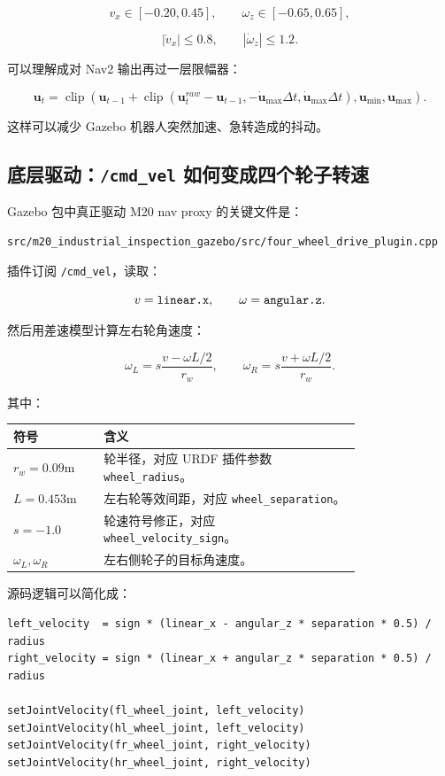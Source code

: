\documentclass[UTF8,11pt,a4paper]{ctexart}
\newcommand{\bs}[1]{\bm{#1}}
\begin{document}
\[
v_x\in[-0.20,0.45],\qquad
\omega_z\in[-0.65,0.65],
\]

\[
|\dot v_x|\le 0.8,\qquad
|\dot\omega_z|\le 1.2.
\]

可以理解成对 Nav2 输出再过一层限幅器：

\[
\boxed{
\bs u_t
=
\operatorname{clip}
\left(
\bs u_{t-1}
+
\operatorname{clip}(\bs u_t^{raw}-\bs u_{t-1},-\dot{\bs u}_{\max}\Delta t,\dot{\bs u}_{\max}\Delta t),
\bs u_{\min},\bs u_{\max}
\right).
}
\]

这样可以减少 Gazebo 机器人突然加速、急转造成的抖动。

\subsection{底层驱动：\texttt{/cmd\_vel} 如何变成四个轮子转速}

Gazebo 包中真正驱动 M20 nav proxy 的关键文件是：

\begin{verbatim}
src/m20_industrial_inspection_gazebo/src/four_wheel_drive_plugin.cpp
\end{verbatim}

插件订阅 \texttt{/cmd\_vel}，读取：

\[
v = \text{\texttt{linear.x}},\qquad
\omega = \text{\texttt{angular.z}}.
\]

然后用差速模型计算左右轮角速度：

\[
\boxed{
\omega_L
=
s\frac{v-\omega L/2}{r_w},
\qquad
\omega_R
=
s\frac{v+\omega L/2}{r_w}.
}
\]

其中：

\begin{center}
\renewcommand{\arraystretch}{1.25}
\begin{tabular}{p{0.18\linewidth}p{0.60\linewidth}}
\toprule
\textbf{符号} & \textbf{含义}\\
\midrule
\(r_w=0.09\mathrm m\) & 轮半径，对应 URDF 插件参数 \texttt{wheel\_radius}。\\
\(L=0.453\mathrm m\) & 左右轮等效间距，对应 \texttt{wheel\_separation}。\\
\(s=-1.0\) & 轮速符号修正，对应 \texttt{wheel\_velocity\_sign}。\\
\(\omega_L,\omega_R\) & 左右侧轮子的目标角速度。\\
\bottomrule
\end{tabular}
\end{center}

源码逻辑可以简化成：

\begin{verbatim}
left_velocity  = sign * (linear_x - angular_z * separation * 0.5) / radius
right_velocity = sign * (linear_x + angular_z * separation * 0.5) / radius

setJointVelocity(fl_wheel_joint, left_velocity)
setJointVelocity(hl_wheel_joint, left_velocity)
setJointVelocity(fr_wheel_joint, right_velocity)
setJointVelocity(hr_wheel_joint, right_velocity)
\end{verbatim}
\end{document}

